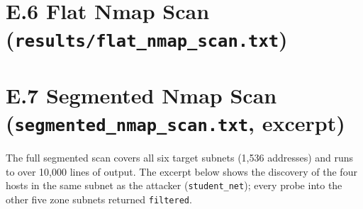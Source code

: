 \section*{E.6 \quad Flat Nmap Scan (\texttt{results/flat\_nmap\_scan.txt})}


\section*{E.7 \quad Segmented Nmap Scan (\texttt{segmented\_nmap\_scan.txt}, excerpt)}
The full segmented scan covers all six target subnets (1{,}536 addresses) and runs to over 10{,}000 lines of output. The excerpt below shows the discovery of the four hosts in the same subnet as the attacker (\texttt{student\_net}); every probe into the other five zone subnets returned \texttt{filtered}.


